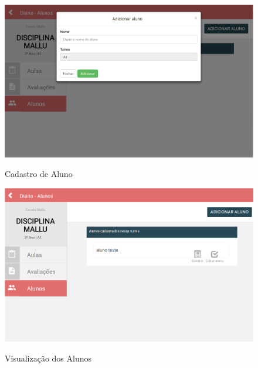 \begin{figure}[!htb]
	\centering
	\caption{Cadastro de Aluno} %
	\includegraphics[scale=0.4]{cadastrarAluno}\\  %
	{\small } %
	\label{fig:cadastrarAluno} %
\end{figure}

\begin{figure}[!htb]
	\centering
	\caption{Visualização dos Alunos } %
	\includegraphics[scale=0.4]{visualizaAlunos}\\  %
	{\small } %
	\label{visualizaAlunos} %
\end{figure}

